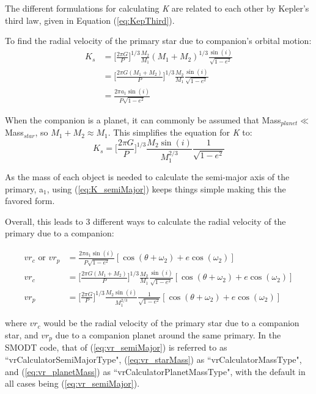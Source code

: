 \documentclass[12pt,preprint]{aastex}
\begin{document}
The different formulations for calculating {\it K} are related to each other by Kepler's third law, given in Equation (\ref{eq:KepThird}).

To find the radial velocity of the primary star due to companion's orbital motion: %
\begin{subequations}\label{eq:30}
\begin{align}\label{eq:K_general}
K_s &= \bigg[\frac{2\pi G}{P}\bigg]^{1/3}\frac{M_2}{M_1}(M_1+M_2)^{1/3}\frac{\sin(i)}{\sqrt{1-e^2}}\\
\label{eq:K_MassGeneral}
&=\bigg[\frac{2\pi G(M_1+M_2)}{P}\bigg]^{1/3}\frac{M_2}{M_1}\frac{\sin(i)}{\sqrt{1-e^2}} \\
\label{eq:K_semiMajor}
&= \frac{2\pi a_1\sin(i)}{P\sqrt{1-e^2}}
\end{align}
\end{subequations}

When the companion is a planet, it can commonly be assumed that Mass$_{planet} \ll$ Mass$_{star}$, so $M_1+M_2 \approx M_1$.  This simplifies the equation for {\it K} to:
\begin{equation}\label{eq:K_planetMass}
K_s = \bigg[\frac{2\pi G}{P}\bigg]^{1/3}\frac{M_2\sin(i)}{M_1^{2/3}}\frac{1}{\sqrt{1-e^2}}
\end{equation}

As the mass of each object is needed to calculate the semi-major axis of the primary, a$_1$, using  (\ref{eq:K_semiMajor}) keeps things simple making this the favored form.

Overall, this leads to 3 different ways to calculate the radial velocity of the primary due to a companion:

\begin{subequations}\label{eq:vr_finals}
\begin{align}\label{eq:vr_semiMajor}
vr_c \text{ or } vr_{p} &= \frac{2\pi a_1\sin(i)}{P\sqrt{1-e^2}}[\cos(\theta+\omega_2)+e \cos(\omega_2)]\\
\label{eq:vr_starMass}
vr_c&=\bigg[\frac{2\pi G(M_1+M_2)}{P}\bigg]^{1/3}\frac{M_2}{M_1}\frac{\sin(i)}{\sqrt{1-e^2}}[\cos(\theta+\omega_2)+e \cos(\omega_2)]\\
\label{eq:vr_planetMass}
vr_{p} &= \bigg[\frac{2\pi G}{P}\bigg]^{1/3}\frac{M_2\sin(i)}{M_1^{2/3}}\frac{1}{\sqrt{1-e^2}}[\cos(\theta+\omega_2)+e \cos(\omega_2)]
\end{align}
\end{subequations}

where $vr_c$ would be the radial velocity of the primary star due to a companion star, and $vr_p$ due to a companion planet around the same primary.  In the SMODT code, that of (\ref{eq:vr_semiMajor}) is referred to as ``vrCalculatorSemiMajorType", (\ref{eq:vr_starMass}) as ``vrCalculatorMassType", and (\ref{eq:vr_planetMass}) as ``vrCalculatorPlanetMassType", with the default in all cases being (\ref{eq:vr_semiMajor}).
\end{document}
